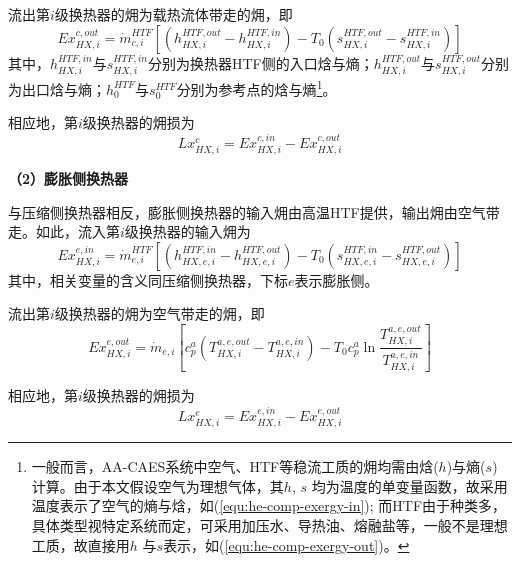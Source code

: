 流出第$i$级换热器的㶲为载热流体带走的㶲，即
\begin{equation}
\label{equ:he-comp-exergy-out}
Ex_{HX,i}^{c,out} = \dot m_{c,i}^{HTF}\left[ {({h_{HX,i}^{HTF,out} - h_{HX,i}^{HTF,in}}) - {T_0}({s_{HX,i}^{HTF,out} - s_{HX,i}^{HTF,in}})}\right]
\end{equation}
其中，$h_{HX,i}^{HTF,in}$与$s_{HX,i}^{HTF,in}$分别为换热器HTF侧的入口焓与熵；$h_{HX,i}^{HTF,out}$与$s_{HX,i}^{HTF,out}$分别为出口焓与熵；$h_{0}^{HTF}$与$s_{0}^{HTF}$分别为参考点的焓与熵\footnote{一般而言，AA-CAES系统中空气、HTF等稳流工质的㶲均需由焓($h$)与熵($s$) 计算。由于本文假设空气为理想气体，其$h$, $s$ 均为温度的单变量函数，故采用温度表示了空气的熵与焓，如(\ref{equ:he-comp-exergy-in}); 而HTF由于种类多，具体类型视特定系统而定，可采用加压水、导热油、熔融盐等，一般不是理想工质，故直接用$h$ 与$s$表示，如(\ref{equ:he-comp-exergy-out})。}。

相应地，第$i$级换热器的㶲损为
\label{equ:he-comp-exergy-loss}
\begin{equation}
Lx_{HX,i}^c = Ex_{HX,i}^{c,in} - Ex_{HX,i}^{c,out}
\end{equation}

\textbf{（2）膨胀侧换热器}

与压缩侧换热器相反，膨胀侧换热器的输入㶲由高温HTF提供，输出㶲由空气带走。如此，流入第$i$级换热器的输入㶲为
\begin{equation}
\label{equ:he-turb-exergy-in}
Ex_{HX,i}^{e,in} = \dot m_{e,i}^{HTF}\left[{({h_{HX,e,i}^{HTF,in} - h_{HX,e,i}^{HTF,out}}) - {T_0}({s_{HX,e,i}^{HTF,in} - s_{HX,e,i}^{HTF,out}})}\right]
\end{equation}
其中，相关变量的含义同压缩侧换热器，下标$e$表示膨胀侧。

流出第$i$级换热器的㶲为空气带走的㶲，即
\begin{equation}
\label{equ:he-turb-exergy-out}
Ex_{HX,i}^{e,out} = {\dot m_{e,i}}[ {c_p^a({T_{HX,i}^{a,e,out} - T_{HX,i}^{a,e,in}}) - {T_0}c_p^a\ln \frac{{T_{HX,i}^{a,e,out}}}{{T_{HX,i}^{a,e,in}}}}]
\end{equation}

相应地，第$i$级换热器的㶲损为
\begin{equation}
\label{equ:he-turb-exergy-loss}
Lx_{HX,i}^e = Ex_{HX,i}^{e,in} - Ex_{HX,i}^{e,out}
\end{equation}

